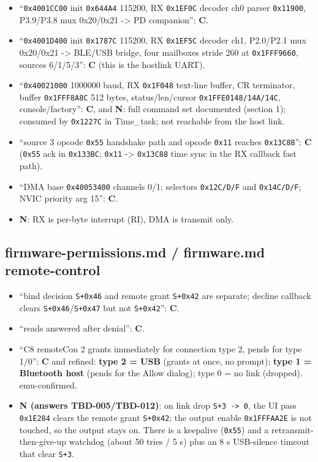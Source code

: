 \begin{itemize}
\tightlist
\item
  ``\texttt{0x4001CC00} init \texttt{0x644A4} 115200, RX
  \texttt{0x1EF0C} decoder ch0 parser \texttt{0x11900}, P3.9/P3.8 mux
  0x20/0x21 -\textgreater{} PD companion'': \textbf{C}.
\item
  ``\texttt{0x4001D400} init \texttt{0x1787C} 115200, RX
  \texttt{0x1EF5C} decoder ch1, P2.0/P2.1 mux 0x20/0x21 -\textgreater{}
  BLE/USB bridge, four mailboxes stride 260 at \texttt{0x1FFF9660},
  sources 6/1/5/3'': \textbf{C} (this is the hostlink UART).
\item
  ``\texttt{0x40021000} 1000000 baud, RX \texttt{0x1F048} text-line
  buffer, CR terminator, buffer \texttt{0x1FFF8A8C} 512 bytes,
  status/len/cursor \texttt{0x1FFE0148/\allowbreak{}14A/\allowbreak{}14C}, console/factory'':
  \textbf{C}, and \textbf{N}: full command set documented (section 1);
  consumed by \texttt{0x1227C} in Time\_task; not reachable from the
  host link.
\item
  ``source 3 opcode \texttt{0x55} handshake path and opcode
  \texttt{0x11} reaches \texttt{0x13C88}'': \textbf{C} (\texttt{0x55}
  ack in \texttt{0x133BC}; \texttt{0x11} -\textgreater{}
  \texttt{0x13C88} time sync in the RX callback fast path).
\item
  ``DMA base \texttt{0x40053400} channels 0/1; selectors
  \texttt{0x12C/\allowbreak{}D/\allowbreak{}F} and \texttt{0x14C/\allowbreak{}D/\allowbreak{}F}; NVIC priority arg 15'':
  \textbf{C}.
\item
  \textbf{N}: RX is per-byte interrupt (RI), DMA is transmit only.
\end{itemize}

\subsection{firmware-permissions.md / firmware.md
remote-control}\label{firmware-permissions.md-firmware.md-remote-control}

\begin{itemize}
\tightlist
\item
  ``bind decision \texttt{S+0x46} and remote grant \texttt{S+0x42} are
  separate; decline callback clears \texttt{S+0x46}/\texttt{S+0x47} but
  not \texttt{S+0x42}'': \textbf{C}.
\item
  ``reads answered after denial'': \textbf{C}.
\item
  ``C8 remoteCon 2 grants immediately for connection type 2, pends for
  type 1/0'': \textbf{C} and refined: \textbf{type 2 = USB} (grants at
  once, no prompt); \textbf{type 1 = Bluetooth host} (pends for the
  Allow dialog); type 0 = no link (dropped). emu-confirmed.
\item
  \textbf{N (answers TBD-005/TBD-012)}: on link drop
  \texttt{S+3\ -\textgreater{}\ 0}, the UI pass \texttt{0x1E284} clears
  the remote grant \texttt{S+0x42}; the output enable
  \texttt{0x1FFFAA2E} is not touched, so the output stays on. There is a
  keepalive (\texttt{0x55}) and a retransmit-then-give-up watchdog
  (about 50 tries / 5 s) plus an 8 s USB-silence timeout that clear
  \texttt{S+3}.
\end{itemize}

